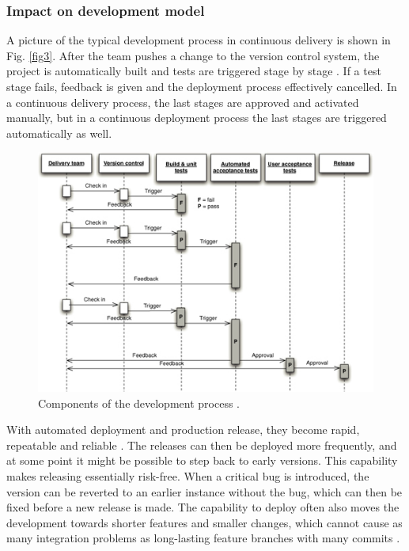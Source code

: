 \documentclass[english]{tktltiki2}
\theoremstyle{definition}
\theoremstyle{remark}
\begin{document}
\subsubsection{Impact on development model}

A picture of the typical development process in continuous delivery is shown in Fig. \ref{fig3}. After the team pushes a change to the version control system, the project is automatically built and tests are triggered stage by stage \cite{cdbook}. If a test stage fails, feedback is given and the deployment process effectively cancelled. In a continuous delivery process, the last stages are approved and activated manually, but in a continuous deployment process the last stages are triggered automatically as well.

\begin{figure}[h]
	\centering
	\includegraphics[width=5.0in]{developmentprocess.jpg}
	\caption{Components of the development process \cite{cdbook}.}
	\label{fig4}
\end{figure}

With automated deployment and production release, they become rapid, repeatable and reliable \cite{cdbook}. The releases can then be deployed more frequently, and at some point it might be possible to step back to early versions. This capability makes releasing essentially risk-free. When a critical bug is introduced, the version can be reverted to an earlier instance without the bug, which can then be fixed before a new release is made. The capability to deploy often also moves the development towards shorter features and smaller changes, which cannot cause as many integration problems as long-lasting feature branches with many commits \cite{cdbook}.
\end{document}

